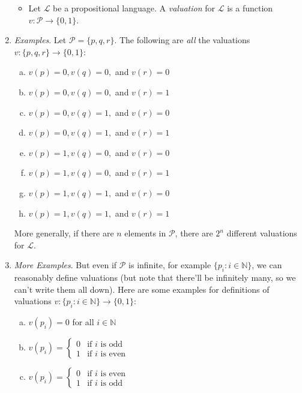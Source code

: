 \begin{enumerate}[\thesection.1]
		\begin{itemize}		
						
			\item Let $\mathcal{L}$ be a propositional language. A \emph{valuation} for $\mathcal{L}$ is a function $v:\mathcal{P}\to\{0,1\}$. 
			
		\end{itemize}
			
	\item \emph{Examples}. Let $\mathcal{P}=\{p,q,r\}$. The following are \emph{all} the valuations $v:\{p,q,r\}\to \{0,1\}$:
	
		\begin{enumerate}[(a)]
		
			\item $v(p)=0, v(q)=0,$ and $v(r)=0$
			\item $v(p)=0, v(q)=0,$ and $v(r)=1$
			\item $v(p)=0, v(q)=1,$ and $v(r)=0$
			\item $v(p)=0, v(q)=1,$ and $v(r)=1$
			\item $v(p)=1, v(q)=0,$ and $v(r)=0$
			\item $v(p)=1, v(q)=0,$ and $v(r)=1$
			\item $v(p)=1, v(q)=1,$ and $v(r)=0$
			\item $v(p)=1, v(q)=1,$ and $v(r)=1$
			 	
		\end{enumerate}
		More generally, if there are $n$ elements in $\mathcal{P}$, there are $2^n$ different valuations for $\mathcal{L}$. 
		
		\item \emph{More Examples}. But even if $\mathcal{P}$ is infinite, for example $\{p_i:i\in\mathbb{N}\}$, we can reasonably define valuations (but note that there'll be infinitely many, so we can't write them all down). Here are some examples for definitions of valuations $v:\{p_i:i\in\mathbb{N}\}\to\{0,1\}$:
		
		\begin{enumerate}[(a)]
		
			\item $v(p_i)=0$ for all $i\in \mathbb{N}$
		
			\item $v(p_i)=\begin{cases} 0 & \text{if }i\text{ is odd}\\1 & \text{if }i\text{ is even}\end{cases}$
			
			\item $v(p_i)=\begin{cases} 0 & \text{if }i\text{ is even}\\1 & \text{if }i\text{ is odd}\end{cases}$
			

\end{enumerate}
\end{enumerate}
